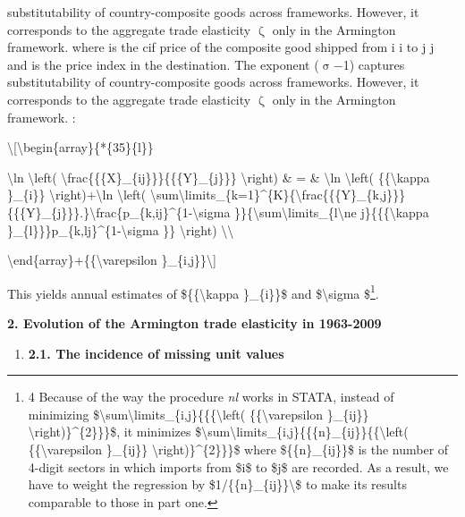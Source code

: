 \documentclass[12pt,twoside,a4paper,notitlepage]{article}
\begin{document}
substitutability of country-composite goods across frameworks. However, it corresponds to the aggregate trade elasticity ${\upzeta}$ only in the Armington framework. where is the cif price of the composite good shipped from i i to j j and is the price index in the destination. The exponent (${\upsigma}$${-}$1) captures substitutability of country-composite goods across frameworks. However, it corresponds to the aggregate trade elasticity ${\upzeta}$ only in the Armington framework. 
 :

\textbackslash [\textbackslash begin\{array\}\{*\{35\}\{l\}\}

 \textbackslash ln \textbackslash left( \textbackslash frac\{\{\{X\}\_\{ij\}\}\}\{\{\{Y\}\_\{j\}\}\} \textbackslash right) \& = \& \textbackslash ln \textbackslash left( \{\{\textbackslash kappa \}\_\{i\}\} \textbackslash right)+\textbackslash ln \textbackslash left( \textbackslash sum\textbackslash limits\_\{k=1\}\textasciicircum{}\{K\}\{\textbackslash frac\{\{\{Y\}\_\{k,j\}\}\}\{\{\{Y\}\_\{j\}\}\}.\}\textbackslash frac\{p\_\{k,ij\}\textasciicircum{}\{1-\textbackslash sigma \}\}\{\textbackslash sum\textbackslash limits\_\{l\textbackslash ne j\}\{\{\{\textbackslash kappa \}\_\{l\}\}\}p\_\{k,lj\}\textasciicircum{}\{1-\textbackslash sigma \}\} \textbackslash right) \textbackslash \textbackslash 

\textbackslash end\{array\}+\{\{\textbackslash varepsilon \}\_\{i,j\}\}\textbackslash ] \label{ref-002}

This yields annual estimates of \$\{\{\textbackslash kappa \}\_\{i\}\}\$ and \$\textbackslash sigma \$\footnote{4 Because of the way the procedure \textit{nl} works in STATA, instead of minimizing \$\textbackslash sum\textbackslash limits\_\{i,j\}\{\{\{\textbackslash left( \{\{\textbackslash varepsilon \}\_\{ij\}\} \textbackslash right)\}\textasciicircum{}\{2\}\}\}\$, it minimizes \$\textbackslash sum\textbackslash limits\_\{i,j\}\{\{\{n\}\_\{ij\}\}\{\{\textbackslash left( \{\{\textbackslash varepsilon \}\_\{ij\}\} \textbackslash right)\}\textasciicircum{}\{2\}\}\}\$ where \$\{\{n\}\_\{ij\}\}\$ is the number of 4-digit sectors in which imports from \$i\$ to \$j\$ are recorded. As a result, we have to weight the regression by \$1/\{\{n\}\_\{ij\}\}\textbackslash \$ to make its results comparable to those in part one.
}. 

\textbf{2. \label{ref-003}Evolution of the Armington trade elasticity in 1963-2009\label{mark-2.}}

\begin{enumerate}[{2}.1]

\item \textbf{2.1. \label{ref-004}The incidence of missing unit values\label{mark-2.1.}}

\end{enumerate}
\end{document}
